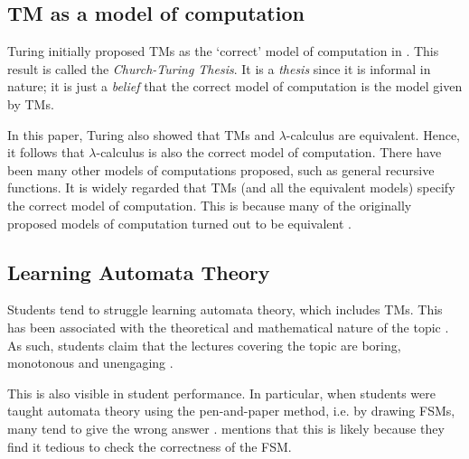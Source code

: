 \subsection{TM as a model of computation}
Turing initially proposed TMs as the `correct' model of computation in \citet{turing1936computable}. This result is called the \emph{Church-Turing Thesis}. It is a \textit{thesis} since it is informal in nature; it is just a \textit{belief} that the correct model of computation is the model given by TMs. 

In this paper, Turing also showed that TMs and $\lambda$-calculus are equivalent. Hence, it follows that $\lambda$-calculus is also the correct model of computation. There have been many other models of computations proposed, such as general recursive functions. It is widely regarded that TMs (and all the equivalent models) specify the correct model of computation. This is because many of the originally proposed models of computation turned out to be equivalent \citep{copeland2004essential}.

\subsection{Learning Automata Theory}
Students tend to struggle learning automata theory, which includes TMs. This has been associated with the theoretical and mathematical nature of the topic \citep{wermelinger2005prolog}. As such, students claim that the lectures covering the topic are boring, monotonous and unengaging \citep{pillay2010learning}. 

This is also visible in student performance. In particular, when students were taught automata theory using the pen-and-paper method, i.e. by drawing FSMs, many tend to give the wrong answer \citep{rodger2006jflap}. \citet{rodger2009increasing} mentions that this is likely because they find it tedious to check the correctness of the FSM.

